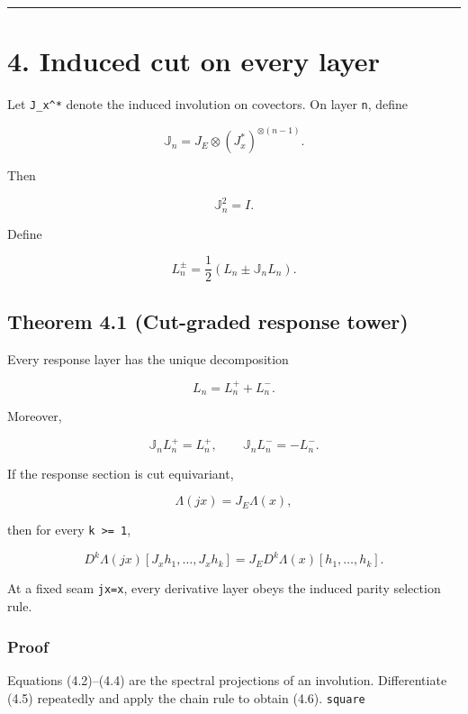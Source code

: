 \begin{center}\rule{0.5\linewidth}{0.5pt}\end{center}

\hypertarget{induced-cut-on-every-layer}{%
\section{4. Induced cut on every layer}\label{induced-cut-on-every-layer}}

Let \texttt{J\_x\^{}*} denote the induced involution on covectors. On layer \texttt{n}, define

\[
\boxed{
\mathbb J_n
=J_E\otimes(J_x^*)^{\otimes(n-1)}.
}
\tag{4.1}
\]

Then

\[
\mathbb J_n^2=I.
\]

Define

\[
\boxed{
L_n^{\pm}
=
\frac12\left(L_n\pm\mathbb J_nL_n\right).
}
\tag{4.2}
\]

\hypertarget{theorem-4.1-cut-graded-response-tower}{%
\subsection{Theorem 4.1 (Cut-graded response tower)}\label{theorem-4.1-cut-graded-response-tower}}

Every response layer has the unique decomposition

\[
\boxed{L_n=L_n^++L_n^-.}
\tag{4.3}
\]

Moreover,

\[
\mathbb J_nL_n^+=L_n^+,
\qquad
\mathbb J_nL_n^-=-L_n^-.
\tag{4.4}
\]

If the response section is cut equivariant,

\[
\Lambda(jx)=J_E\Lambda(x),
\tag{4.5}
\]

then for every \texttt{k\ \textgreater{}=\ 1},

\[
D^k\Lambda(jx)
[J_xh_1,\ldots,J_xh_k]
=
J_E D^k\Lambda(x)[h_1,\ldots,h_k].
\tag{4.6}
\]

At a fixed seam \texttt{jx=x}, every derivative layer obeys the induced parity
selection rule.

\hypertarget{proof-1}{%
\subsubsection{Proof}\label{proof-1}}

Equations (4.2)--(4.4) are the spectral projections of an involution.
Differentiate (4.5) repeatedly and apply the chain rule to obtain (4.6).
\texttt{square}

